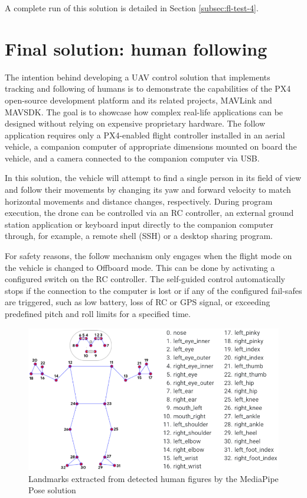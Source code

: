 A complete run of this solution is detailed in Section \ref{subsec:fl-test-4}.

 
\section{Final solution: human following}
\label{sec:follow}

The intention behind developing a UAV control solution that implements tracking and following of humans is to demonstrate the capabilities of the PX4 open-source development platform and its related projects, MAVLink and MAVSDK. The goal is to showcase how complex real-life applications can be designed without relying on expensive proprietary hardware. The follow application requires only a PX4-enabled flight controller installed in an aerial vehicle, a companion computer of appropriate dimensions mounted on board the vehicle, and a camera connected to the companion computer via USB.

In this solution, the vehicle will attempt to find a single person in its field of view and follow their movements by changing its yaw and forward velocity to match horizontal movements and distance changes, respectively.
During program execution, the drone can be controlled via an RC controller, an external ground station application or keyboard input directly to the companion computer through, for example, a remote shell (SSH) or a desktop sharing program.

For safety reasons, the follow mechanism only engages when the flight mode on the vehicle is changed to Offboard mode. This can be done by activating a configured switch on the RC controller. The self-guided control automatically stops if the connection to the computer is lost or if any of the configured fail-safes are triggered, such as low battery, loss of RC or GPS signal, or exceeding predefined pitch and roll limits for a specified time.

\begin{figure}
  \centering
  \includegraphics[width=\textwidth, keepaspectratio]{img/pose-landmarks.png}
  \caption{Landmarks extracted from detected human figures by the MediaPipe Pose solution}
  \label{fig:pose-landmarks}
\end{figure}

